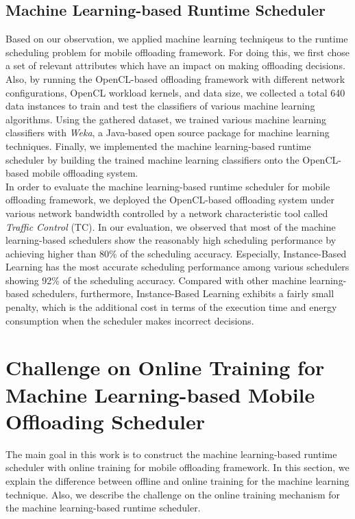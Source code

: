 \documentclass[10pt, conference, compsocconf]{IEEEtran}
\begin{document}
\subsection{Machine Learning-based Runtime Scheduler}
%
Based on our observation, we applied machine learning techniqeus to the
runtime scheduling problem for mobile offloading framework.
%
For doing this, we first chose a set of relevant attributes which have
an impact on making offloading decisions.
%
Also, by running the OpenCL-based offloading framework with different
network configurations, OpenCL workload kernels, and data size, we
collected a total 640 data instances to train and test the classifiers
of various machine learning algorithms.
%
Using the gathered dataset, we trained various machine learning
classifiers with \textit{Weka}, a Java-based open source package for
machine learning techniques.
%
Finally, we implemented the machine learning-based runtime scheduler by
building the trained machine learning classifiers onto the
OpenCL-based mobile offloading system.\\
%
\indent In order to evaluate the machine learning-based runtime
scheduler for mobile offloading framework, we deployed the OpenCL-based
offloading system under various network bandwidth controlled by a
network characteristic tool called \textit{Traffic Control} (TC).
%
In our evaluation, we observed that most of the machine learning-based
schedulers show the reasonably high scheduling performance by achieving
higher than 80\% of the scheduling accuracy.
%
Especially, Instance-Based Learning has the most accurate scheduling
performance among various schedulers showing 92\% of the scheduling
accuracy.
%
Compared with other machine learning-based schedulers, furthermore,
Instance-Based Learning exhibits a fairly small penalty, which is the
additional cost in terms of the execution time and energy consumption
when the scheduler makes incorrect decisions.
%
\section{Challenge on Online Training for Machine Learning-based Mobile
Offloading Scheduler}
%
The main goal in this work is to construct the machine learning-based
runtime scheduler with online training for mobile offloading framework.
%
In this section, we explain the difference between offline and online
training for the machine learning technique.
%
Also, we describe the challenge on the online training mechanism for the
machine learning-based runtime scheduler.
%
\end{document}
